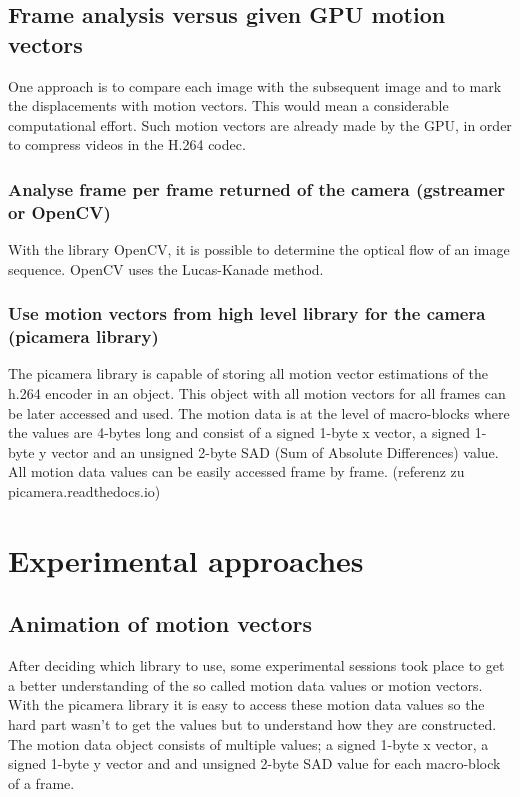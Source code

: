\documentclass[12pt, a4paper]{report}
\begin{document}
\section{Frame analysis versus given GPU motion vectors}
One approach is to compare each image with the subsequent image and to mark the displacements with motion vectors. This would mean a considerable computational effort.
Such motion vectors are already made by the GPU, in order to compress videos in the H.264 codec.

\subsection{Analyse frame per frame returned of the camera (gstreamer or OpenCV)}
With the library OpenCV, it is possible to determine the optical flow of an image sequence. OpenCV uses the Lucas-Kanade method.
\subsection{Use motion vectors from high level library for the camera (picamera library)}
The picamera library is capable of storing all motion vector estimations of the h.264 encoder in an object. This object with all motion vectors for all frames can be later accessed and used. The motion data is at the level of macro-blocks where the values are 4-bytes long and consist of a signed 1-byte x vector, a signed 1-byte y vector and an unsigned 2-byte SAD (Sum of Absolute Differences) value. All motion data values can be easily accessed frame by frame.
(referenz zu picamera.readthedocs.io)

\chapter {Experimental approaches}
\section{Animation of motion vectors}
After deciding which library to use, some experimental sessions took place to get a better understanding of the so called motion data values or motion vectors. 
With the picamera library it is easy to access these motion data values so the hard part wasn't to get the values but to understand how they are constructed. 
The motion data object consists of multiple values; a signed 1-byte x vector, a signed 1-byte y vector and and unsigned 2-byte SAD value for each macro-block of a frame.
\end{document}
